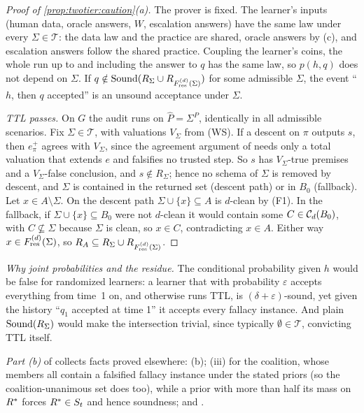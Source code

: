 \begin{proof}[Proof of \cref{prop:twotier:caution}(a)]
The prover is fixed. The learner's inputs (human data, oracle answers, $W$, escalation answers) have the same law under every $\Sigma\in\mathcal T$: the data law and the practice are shared, oracle answers by (c), and escalation answers follow the shared practice. Coupling the learner's coins, the whole run up to and including the answer to $q$ has the same law, so $p(h,q)$ does not depend on $\Sigma$. If $q\notin\mathrm{Sound}(R_\Sigma\cup R_{F^{(d)}_{\mathrm{res}}(\Sigma)})$ for some admissible $\Sigma$, the event ``$h$, then $q$ accepted'' is an unsound acceptance under $\Sigma$.

\emph{TTL passes.} On $G$ the audit runs on $\hat P=\Sigma^P$, identically in all admissible scenarios. Fix $\Sigma\in\mathcal T$, with valuations $V_\Sigma$ from (WS). If a descent on $\pi$ outputs $s$, then $e^+_\pi$ agrees with $V_\Sigma$, since the agreement argument of  needs only a total valuation that extends $e$ and falsifies no trusted step. So $s$ has $V_\Sigma$-true premises and a $V_\Sigma$-false conclusion, and $s\notin R_\Sigma$; hence no schema of $\Sigma$ is removed by descent, and $\Sigma$ is contained in the returned set (descent path) or in $B_0$ (fallback). Let $x\in A\setminus\Sigma$. On the descent path $\Sigma\cup\{x\}\subseteq A$ is $d$-clean by (F1). In the fallback, if $\Sigma\cup\{x\}\subseteq B_0$ were not $d$-clean it would contain some $C\in\mathcal{C}_d(B_0)$, with $C\not\subseteq\Sigma$ because $\Sigma$ is clean, so $x\in C$, contradicting $x\in A$. Either way $x\in F^{(d)}_{\mathrm{res}}(\Sigma)$, so $R_A\subseteq R_\Sigma\cup R_{F^{(d)}_{\mathrm{res}}(\Sigma)}$.
\end{proof}

\emph{Why joint probabilities and the residue.} The conditional probability given $h$ would be false for randomized learners: a learner that with probability $\varepsilon$ accepts everything from time~1 on, and otherwise runs TTL, is $(\delta+\varepsilon)$-sound, yet given the history ``$q_1$ accepted at time 1'' it accepts every fallacy instance. And plain $\mathrm{Sound}(R_\Sigma)$ would make the intersection trivial, since typically $\emptyset\in\mathcal T$, convicting TTL itself.

\emph{Part (b)} of  collects facts proved elsewhere: (b); (iii) for the coalition, whose members all contain a falsified fallacy instance under the stated priors (so the coalition-unanimous set does too), while a prior with more than half its mass on $R^{*}$ forces $R^{*}\in S_t$ and hence soundness; and .


